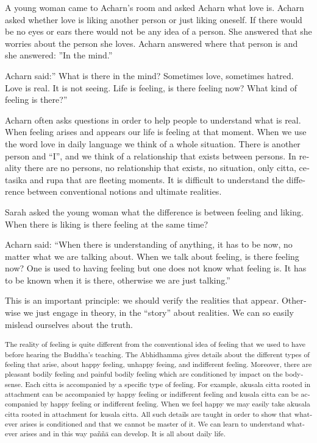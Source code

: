 \textdutch{A young woman came to Acharn's room and asked Acharn what
love is. Acharn asked whether love is liking another person or just
liking oneself. If there would be no eyes or ears there would not be any
idea of a person. She answered that she worries about the person she
loves. Acharn answered where that person is and she answered: ''In the
mind.'' }

\textdutch{Acharn said:'' What is there in the mind? Sometimes love,
sometimes hatred. Love is real. It is not seeing. Life is feeling, is
there feeling now? What kind of feeling is there?'' }

\textdutch{Acharn often asks questions in order to help people to
understand what is real. When feeling arises and appears our life is
feeling at that moment. When we use the word love in daily language we
think of a whole situation. There is another person and ``I'', and we
think of a relationship that exists between persons. In reality there
are no persons, no relationship that exists, no situation, only citta,
cetasika and rupa that are fleeting moments. It is difficult to
understand the difference between conventional notions and ultimate
realities.}

\textdutch{Sarah asked the young woman what the difference is between
feeling and liking. When there is liking is there feeling at the same
time?}

\textdutch{Acharn said: ``When there is understanding of anything, it
has to be now, no matter what we are talking about. When we talk about
feeling, is there feeling now? One is used to having feeling but one
does not know what feeling is. It has to be known when it is there,
otherwise we are just talking.'' }

\textdutch{This is an important principle: we should verify the
realities that appear. Otherwise we just engage in theory, in the
``story'' about realities. We can so easily mislead ourselves about the
truth. }

\textsuperscript{\textdutch{The reality of feeling is quite different
from the conventional idea of feeling that we used to have before
hearing the Buddha's teaching. }\textenglish[variant=american]{The
Abhidhamma gives details about the different types of
}\textdutch{feeling}\textenglish[variant=american]{ that arise,
}\textdutch{about happy feeling, unhappy feeing, and indifferent
feeling. Moreover, there are pleasant bodily feeling and painful bodily
feeling which are conditioned by impact on the bodysense. Each citta is
accompanied by a specific type of feeling. For example, akusala citta
rooted in attachment can be accompanied by happy feeling or indifferent
feeling and kusala citta can be accompanied by happy feeling or
indifferent feeling. W}\textenglish[variant=american]{hen we feel
happy}\textdutch{ we may easily take akusala citta rooted in attachment
for kusala citta. All such details are taught in order to show that
}\textenglish[variant=american]{whatever arises is conditioned and that
we cannot be master of it. We can learn to understand whatever arises
and in this way }\textdutch{paññā}\textenglish[variant=american]{ can
develop. It is all about daily life.}\textdutch{ }}

